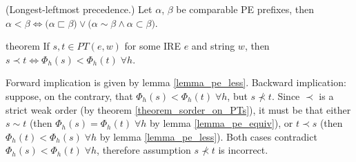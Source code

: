 \documentclass[AMA,STIX1COL]{WileyNJD-v2}
\newcommand{\PT}{PT}
\begin{document}
    \begin{definition}\label{pe_order}
    (Longest-leftmost precedence.)
    Let $\alpha$, $\beta$ be comparable PE prefixes, then
    $\alpha < \beta \Leftrightarrow
        \big( \alpha \sqsubset \beta \big) \vee
        \big( \alpha \sim \beta \wedge \alpha \subset \beta \big)$.
    \end{definition}

\begin{theoremEnd}[restate, no link to proof, no link to theorem, category=theorem_order_on_pe_same_as_on_pt]{theorem}
    \label{theorem_order_on_pe_same_as_on_pt}
    If $s, t \in \PT(e, w)$ for some IRE $e$ and string $w$, then
    $s \prec t \Leftrightarrow \Phi_{h}(s) < \Phi_{h}(t) \; \forall h$.
\end{theoremEnd}
\begin{proofEnd}
    Forward implication is given by lemma \ref{lemma_pe_less}.
    Backward implication:
    suppose, on the contrary, that $\Phi_{h}(s) < \Phi_{h}(t) \; \forall h$, but $s \not\prec t$.
    Since $\prec$ is a strict weak order (by theorem \ref{theorem_sorder_on_PTs}),
    it must be that either $s \sim t$
    (then $\Phi_{h}(s) = \Phi_{h}(t) \; \forall h$ by lemma \ref{lemma_pe_equiv}),
    or $t \prec s$
    (then $\Phi_{h}(t) < \Phi_{h}(s) \; \forall h$ by lemma \ref{lemma_pe_less}).
    Both cases contradict $\Phi_{h}(s) < \Phi_{h}(t) \; \forall h$,
    therefore assumption $s \not\prec t$ is incorrect.
\end{proofEnd}
\end{document}
